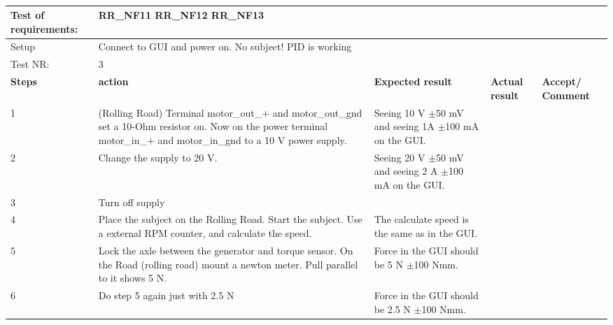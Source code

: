 \begin{table}[h!]
	\centering
	\label{my-label}	
	\begin{tabular}{|p{1.5 cm}|p{4.2 cm}|p{2.1 cm}|p{2.1 cm}|p{2.1 cm}|}
		\hline
		Test of requirements: 
		& \multicolumn{4}{l|}{RR\_NF11 RR\_NF12 RR\_NF13} \\ \hline
		Setup 
		& \multicolumn{4}{l|}{Connect to GUI and power on. No subject! PID is working} \\ \hline
		Test NR:
		& \multicolumn{4}{l|}{3} \\ \hline
		\textbf{Steps} & \textbf{action} & \textbf{Expected result} & 
		\textbf{Actual result} & \textbf{Accept/ Comment} \\ \hline
		1 
		& (Rolling Road) Terminal motor\_out\_+ and motor\_out\_gnd set a 10-Ohm resistor on. Now on the power terminal motor\_in\_+ and motor\_in\_gnd to a 10 V power supply.  
		& Seeing 10 V $\pm$50 mV and seeing 1A $\pm$100 mA on the GUI. 
		&
		& \\ \hline
		2
		& Change the supply to 20 V.
		& Seeing 20 V $\pm$50 mV and seeing 2 A $\pm$100 mA on the GUI.
		&
		& \\ \hline
		3
		& Turn off supply
		& 
		&
		& \\ \hline
		4
		& Place the subject on the Rolling Road. Start the subject. Use a external RPM counter, and calculate the speed. 
		& The calculate speed is the same as in the GUI.
		&
		& \\ \hline
		5
		& Lock the axle between the generator and torque sensor. On the Road (rolling road) mount a newton meter. Pull parallel to it shows 5 N.  
		& Force in the GUI should be 5 N $\pm$100 Nmm.
		&
		& \\ \hline
		6
		& Do step 5 again just with 2.5 N 
		& Force in the GUI should be 2.5 N $\pm$100 Nmm.
		&
		& \\ \hline
	\end{tabular}
	\caption{}
\end{table}


